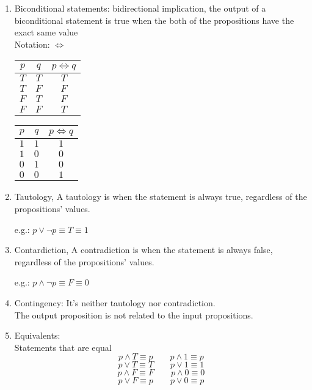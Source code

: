 \documentclass{article}
\begin{document}
\begin{enumerate}[label=Def. \arabic*:, leftmargin=3.5em, align=left]
  \newpage

  \item Biconditional statements: bidirectional implication, the output of a biconditional statement is true when the both of the propositions have the exact same value\\
  Notation: $\Leftrightarrow$
  \begin{center}
    \begin{tabular}{cc|c}
      $p$ & $q$ & $p \Leftrightarrow q$ \\ \hline 
      $T$ & $T$ & $T$ \\
      $T$ & $F$ & $F$ \\
      $F$ & $T$ & $F$ \\
      $F$ & $F$ & $T$ \\
    \end{tabular} \qquad
    \begin{tabular}{cc|c}
      $p$ & $q$ & $p \Leftrightarrow q$ \\ \hline 
      $1$ & $1$ & $1$ \\
      $1$ & $0$ & $0$ \\
      $0$ & $1$ & $0$ \\
      $0$ & $0$ & $1$ \\
    \end{tabular}
  \end{center}

  \item Tautology, A tautology is when the statement is always true, regardless of the propositions' values.
  \begin{center}
    e.g.: $p \vee \neg p \equiv T \equiv 1$
  \end{center}

  \item Contardiction, A contradiction is when the statement is always false, regardless of the propositions' values.
  \begin{center}
    e.g.: $p \wedge \neg p \equiv F \equiv 0$
  \end{center}

  \item Contingency:
  It's neither tautology nor contradiction.\\
  The output proposition is not related to the input propositions.

  \item Equivalents:\\
  Statements that are equal
  $$p \wedge T \equiv p \qquad p \wedge 1 \equiv p$$
  $$p \vee T \equiv T \qquad p \vee 1 \equiv 1$$
  $$p \wedge F \equiv F \qquad p \wedge 0 \equiv 0$$
  $$p \vee F \equiv p \qquad p \vee 0 \equiv p$$
\end{enumerate}
\end{document}
